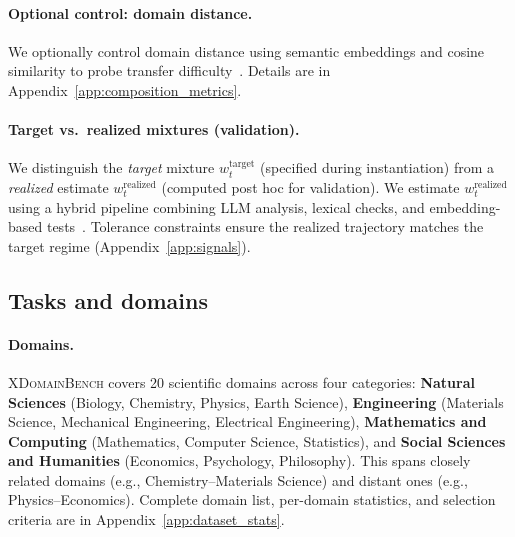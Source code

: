 \paragraph{Optional control: domain distance.}
We optionally control domain distance using semantic embeddings and cosine similarity to probe transfer difficulty~\citep{kashyap2021domain}.
Details are in Appendix~\ref{app:composition_metrics}.

\paragraph{Target vs.\ realized mixtures (validation).}
We distinguish the \emph{target} mixture $w_t^{\text{target}}$ (specified during instantiation) from a \emph{realized} estimate $w_t^{\text{realized}}$ (computed post hoc for validation).
We estimate $w_t^{\text{realized}}$ using a hybrid pipeline combining LLM analysis, lexical checks, and embedding-based tests~\citep{zheng-etal-2023-judging,laskar-etal-2024-systematic,reimers-gurevych-2019-sentence}.
Tolerance constraints ensure the realized trajectory matches the target regime (Appendix~\ref{app:signals}).

\subsection{Tasks and domains}
\label{sec:tasks_domains}

\paragraph{Domains.}
\textsc{XDomainBench} covers 20 scientific domains across four categories: \textbf{Natural Sciences} (Biology, Chemistry, Physics, Earth Science), \textbf{Engineering} (Materials Science, Mechanical Engineering, Electrical Engineering), \textbf{Mathematics and Computing} (Mathematics, Computer Science, Statistics), and \textbf{Social Sciences and Humanities} (Economics, Psychology, Philosophy).
This spans closely related domains (e.g., Chemistry--Materials Science) and distant ones (e.g., Physics--Economics).
Complete domain list, per-domain statistics, and selection criteria are in Appendix~\ref{app:dataset_stats}.

